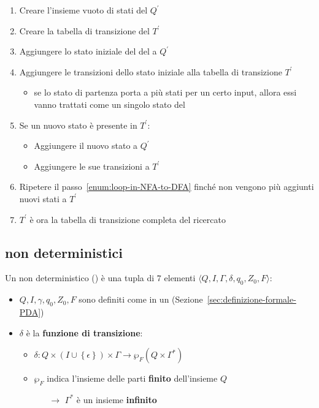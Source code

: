 \documentclass[italian, 10pt]{article}
\begin{document}
\begin{enumerate}
  \item Creare l'insieme vuoto di stati del \DFA \(Q^\prime\)
  \item Creare la tabella di transizione del \DFA \(T^\prime\)
  \item Aggiungere lo stato iniziale del del \NFA a \(Q^\prime\)
  \item Aggiungere le transizioni dello stato iniziale alla tabella di transizione \(T^\prime\)
        \begin{itemize}[label=\(\rightarrow\)]
          \item se lo stato di partenza porta a più stati per un certo input, allora essi vanno trattati come un singolo stato del \DFA
        \end{itemize}
  \item \label{enum:loop-in-NFA-to-DFA} Se un nuovo stato è presente in \(T^\prime\):
        \begin{itemize}[label=\(\rightarrow\)]
          \item Aggiungere il nuovo stato a \(Q^\prime\)
          \item Aggiungere le sue transizioni a \(T^\prime\)
        \end{itemize}
  \item Ripetere il passo~\ref{enum:loop-in-NFA-to-DFA} finché non vengono più aggiunti nuovi stati a \(T^\prime\)
  \item \(T^\prime\) è ora la tabella di transizione completa del \DFA ricercato
\end{enumerate}

\subsection{\PDA non deterministici}
\label{sec:definzione-NPDA}

Un \PDA non deterministico (\NPDA) è una tupla di \(7\) elementi \(\langle Q, I, \Gamma, \delta, q_0, Z_0, F \rangle\):

\begin{itemize}
  \item \(Q, I, \gamma, q_0, Z_0, F\) sono definiti come in un \PDA (Sezione~\ref{sec:definizione-formale-PDA})
  \item \(\delta\) è la \textbf{funzione di transizione}:
        \begin{itemize}
          \item \(\delta: Q \times \left(I \cup \left\{\epsilon\right\}\right) \times \Gamma \rightarrow \wp_F (Q \times \Gamma^\ast)\)
          \item \(\wp_F\) indica l'insieme delle parti \textbf{finito} dell'insieme \(Q\)
                \begin{itemize}
                  \item[\(\rightarrow\)] \(\Gamma^\ast\) è un insieme \textbf{infinito}
                \end{itemize}
        \end{itemize}
\end{itemize}
\end{document}
